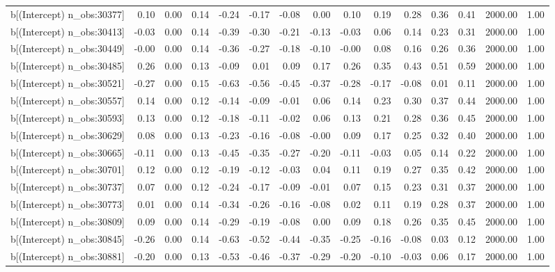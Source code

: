 \begin{table}[ht]
\begin{tabular}{rrrrrrrrrrrrrrr}
  b[(Intercept) n\_obs:30377] & 0.10 & 0.00 & 0.14 & -0.24 & -0.17 & -0.08 & 0.00 & 0.10 & 0.19 & 0.28 & 0.36 & 0.41 & 2000.00 & 1.00 \\ 
  b[(Intercept) n\_obs:30413] & -0.03 & 0.00 & 0.14 & -0.39 & -0.30 & -0.21 & -0.13 & -0.03 & 0.06 & 0.14 & 0.23 & 0.31 & 2000.00 & 1.00 \\ 
  b[(Intercept) n\_obs:30449] & -0.00 & 0.00 & 0.14 & -0.36 & -0.27 & -0.18 & -0.10 & -0.00 & 0.08 & 0.16 & 0.26 & 0.36 & 2000.00 & 1.00 \\ 
  b[(Intercept) n\_obs:30485] & 0.26 & 0.00 & 0.13 & -0.09 & 0.01 & 0.09 & 0.17 & 0.26 & 0.35 & 0.43 & 0.51 & 0.59 & 2000.00 & 1.00 \\ 
  b[(Intercept) n\_obs:30521] & -0.27 & 0.00 & 0.15 & -0.63 & -0.56 & -0.45 & -0.37 & -0.28 & -0.17 & -0.08 & 0.01 & 0.11 & 2000.00 & 1.00 \\ 
  b[(Intercept) n\_obs:30557] & 0.14 & 0.00 & 0.12 & -0.14 & -0.09 & -0.01 & 0.06 & 0.14 & 0.23 & 0.30 & 0.37 & 0.44 & 2000.00 & 1.00 \\ 
  b[(Intercept) n\_obs:30593] & 0.13 & 0.00 & 0.12 & -0.18 & -0.11 & -0.02 & 0.06 & 0.13 & 0.21 & 0.28 & 0.36 & 0.45 & 2000.00 & 1.00 \\ 
  b[(Intercept) n\_obs:30629] & 0.08 & 0.00 & 0.13 & -0.23 & -0.16 & -0.08 & -0.00 & 0.09 & 0.17 & 0.25 & 0.32 & 0.40 & 2000.00 & 1.00 \\ 
  b[(Intercept) n\_obs:30665] & -0.11 & 0.00 & 0.13 & -0.45 & -0.35 & -0.27 & -0.20 & -0.11 & -0.03 & 0.05 & 0.14 & 0.22 & 2000.00 & 1.00 \\ 
  b[(Intercept) n\_obs:30701] & 0.12 & 0.00 & 0.12 & -0.19 & -0.12 & -0.03 & 0.04 & 0.11 & 0.19 & 0.27 & 0.35 & 0.42 & 2000.00 & 1.00 \\ 
  b[(Intercept) n\_obs:30737] & 0.07 & 0.00 & 0.12 & -0.24 & -0.17 & -0.09 & -0.01 & 0.07 & 0.15 & 0.23 & 0.31 & 0.37 & 2000.00 & 1.00 \\ 
  b[(Intercept) n\_obs:30773] & 0.01 & 0.00 & 0.14 & -0.34 & -0.26 & -0.16 & -0.08 & 0.02 & 0.11 & 0.19 & 0.28 & 0.37 & 2000.00 & 1.00 \\ 
  b[(Intercept) n\_obs:30809] & 0.09 & 0.00 & 0.14 & -0.29 & -0.19 & -0.08 & 0.00 & 0.09 & 0.18 & 0.26 & 0.35 & 0.45 & 2000.00 & 1.00 \\ 
  b[(Intercept) n\_obs:30845] & -0.26 & 0.00 & 0.14 & -0.63 & -0.52 & -0.44 & -0.35 & -0.25 & -0.16 & -0.08 & 0.03 & 0.12 & 2000.00 & 1.00 \\ 
  b[(Intercept) n\_obs:30881] & -0.20 & 0.00 & 0.13 & -0.53 & -0.46 & -0.37 & -0.29 & -0.20 & -0.10 & -0.03 & 0.06 & 0.17 & 2000.00 & 1.00 \\ 

\end{tabular}
\end{table}

